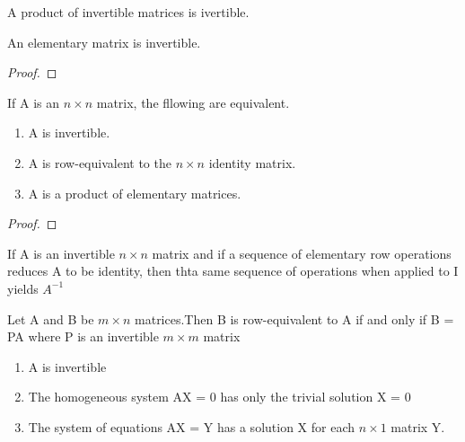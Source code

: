 \begin{corollary}
	A product of invertible matrices is ivertible.
\end{corollary}

\begin{theorem}
	An elementary matrix is invertible.
\end{theorem}

\begin{proof}

\end{proof}


\begin{theorem}
	If A is an $n \times n$ matrix, the fllowing are equivalent.
	\begin{enumerate}
		\item A is invertible.
		\item A is row-equivalent to the $n \times n$ identity matrix.
		\item A is a product of elementary matrices.
	\end{enumerate}
\end{theorem}

\begin{proof}

\end{proof}


\begin{corollary}
	If A is an invertible $n \times n$ matrix and if a sequence of elementary row operations reduces A to be identity, then thta same sequence of operations when applied to I yields $A^{-1}$

\end{corollary}

\begin{corollary}
	Let A and B be $m \times n$ matrices.Then B is row-equivalent to A if and only if B = PA where P is an invertible $m \times m$ matrix
\end{corollary}

\begin{theorem}
	\begin{enumerate}
		\item A is invertible
		\item The homogeneous system AX = 0 has only the trivial solution X = 0
		\item The system of equations AX = Y has a solution X for each $n \times 1$ matrix Y.
	\end{enumerate}
\end{theorem}


